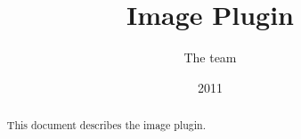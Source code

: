 \documentclass[a4paper,11pt]{article}
\title{Image Plugin}
\author{The \sofa{} team}
\date{2011}
\begin{document}
 
\maketitle

\begin{abstract}
This document describes the \sofa{} image plugin.
\end{abstract}


\end{document}
